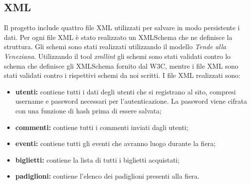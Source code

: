\subsection{XML}
Il progetto include quattro file XML utilizzati per salvare in modo persistente i dati. Per ogni file XML è stato realizzato un XMLSchema che ne definisce la struttura. Gli schemi sono stati realizzati utilizzando il modello \textit{Tende alla Veneziana}. Utilizzando il tool \textit{xmllint} gli schemi sono stati validati contro lo schema che definisce gli XMLSchema fornito dal W3C, mentre i file XML sono stati validati contro i rispettivi schemi da noi scritti. \newline
I file XML realizzati sono:
\begin{itemize}
	\item \textbf{utenti:} contiene tutti i dati degli utenti che si registrano al sito, compresi username e password necessari per l'autenticazione. La password viene cifrata con una funzione di hash prima di essere salvata;
	\item \textbf{commenti:} contiene tutti i commenti inviati dagli utenti;
	\item \textbf{eventi:} contiene tutti gli eventi che avranno luogo durante la fiera;
	\item \textbf{biglietti:} contiene la lista di tutti i biglietti acquistati;
	\item \textbf{padiglioni:} contiene l'elenco dei padiglioni presenti alla fiera.
\end{itemize}